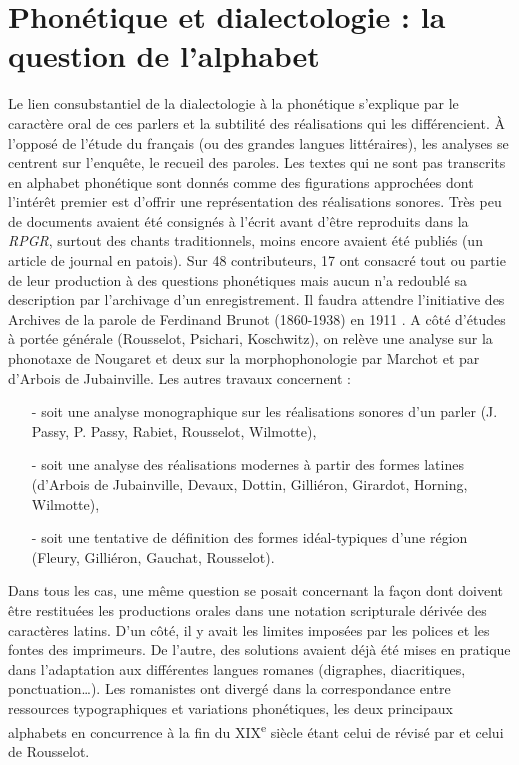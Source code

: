 \documentclass[output=paper]{langsci/langscibook}
\begin{document}
\section{Phonétique et dialectologie : la question de l’alphabet}

Le lien consubstantiel de la dialectologie à la phonétique s’explique par le caractère oral de ces parlers et la subtilité des réalisations qui les différencient. À l’opposé de l’étude du français (ou des grandes langues littéraires), les analyses se centrent sur l’enquête, le recueil des paroles. Les textes qui ne sont pas transcrits en alphabet phonétique sont donnés comme des figurations approchées dont l’intérêt premier est d’offrir une représentation des réalisations sonores. Très peu de documents avaient été consignés à l’écrit avant d’être reproduits dans la \textit{RPGR}, surtout des chants traditionnels, moins encore avaient été publiés (un article de journal en patois). Sur 48 contributeurs, 17 ont consacré tout ou partie de leur production à des questions phonétiques mais aucun n’a redoublé sa description par l’archivage d’un enregistrement. Il faudra attendre l’initiative des Archives de la parole de Ferdinand Brunot (1860-1938) en 1911 \citep{cordereix_ferdinand_2001}. A côté d’études à portée générale (Rousselot, Psichari, Koschwitz), on relève une analyse sur la phonotaxe de Nougaret et deux sur la morphophonologie par Marchot et par d’Arbois de Jubainville. Les autres travaux concernent :

\begin{itemize}
    \item[-] soit une analyse monographique sur les réalisations sonores d’un parler (J. Passy, P. Passy, Rabiet, Rousselot, Wilmotte), 

    \item[-] soit une analyse des réalisations modernes à partir des formes latines (d’Arbois de Jubainville, Devaux, Dottin, Gilliéron, Girardot, Horning, Wilmotte), 

    \item[-] soit une tentative de définition des formes idéal-typiques d’une région (Fleury, Gilliéron, Gauchat, Rousselot).
\end{itemize}

Dans tous les cas, une même question se posait concernant la façon dont doivent être restituées les productions orales dans une notation scripturale dérivée des caractères latins. D’un côté, il y avait les limites imposées par les polices et les fontes des imprimeurs. De l’autre, des solutions avaient déjà été mises en pratique dans l’adaptation aux différentes langues romanes (digraphes, diacritiques, ponctuation…). Les romanistes ont divergé dans la correspondance entre ressources typographiques et variations phonétiques, les deux principaux alphabets en concurrence à la fin du XIX\textsuperscript{e} siècle étant celui de \citet{bohmer_sonis_1871} révisé par \citet{ascoli_trascrizioni_1873} et celui de Rousselot.
\end{document}
